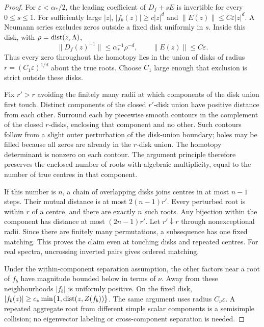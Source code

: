 \begin{proof}
For $\varepsilon<\alpha_*/2$, the leading coefficient of $D_f+sE$
is invertible for every $0\le s\le1$. For sufficiently large $|z|$,
$|f_b(z)|\ge c|z|^d$ and $\|E(z)\|\le C\varepsilon|z|^d$.
A Neumann series excludes zeros outside a fixed disk uniformly in $s$.
Inside this disk, with $\rho=\operatorname{dist}(z,\Lambda)$,
\[
 \|D_f(z)^{-1}\|\le\alpha_*^{-1}\rho^{-d},\qquad
 \|E(z)\|\le C\varepsilon.
\]
Thus every zero throughout the homotopy lies in the union of disks of
radius $r=(C_1\varepsilon)^{1/d}$ about the true roots. Choose $C_1$
large enough that exclusion is strict outside these disks.

Fix $r'>r$ avoiding the finitely many radii at which components of
the disk union first touch. Distinct components of the closed $r'$-disk
union have positive distance from each other. Surround each by
piecewise smooth contours in the complement of the closed $r$-disks,
enclosing that component and no other. Such contours follow from a
slight outer perturbation of the disk-union boundary; holes may be
filled because all zeros are already in the $r$-disk union. The
homotopy determinant is nonzero on each contour. The argument principle
therefore preserves the enclosed number of roots with algebraic
multiplicity, equal to the number of true centres in that component.

If this number is $n$, a chain of overlapping disks joins centres in
at most $n-1$ steps. Their mutual distance is at most $2(n-1)r'$.
Every perturbed root is within $r$ of a centre, and there are exactly
$n$ such roots. Any bijection within the component has distance at most
$(2n-1)r'$. Let $r'\downarrow r$ through nonexceptional radii. Since
there are finitely many permutations, a subsequence has one fixed
matching. This proves the claim even at touching disks and repeated
centres. For real spectra, uncrossing inverted pairs gives ordered
matching.

Under the within-component separation assumption, the other factors
near a root of $f_b$ have magnitude bounded below in terms of $\nu$.
Away from these neighbourhoods $|f_b|$ is uniformly positive. On the
fixed disk,
$|f_b(z)|\ge c_\nu\min\{1,\operatorname{dist}(z,Z(f_b))\}$.
The same argument uses radius $C_\nu\varepsilon$. A repeated aggregate
root from different simple scalar components is a semisimple collision;
no eigenvector labeling or cross-component separation is needed.
\end{proof}

